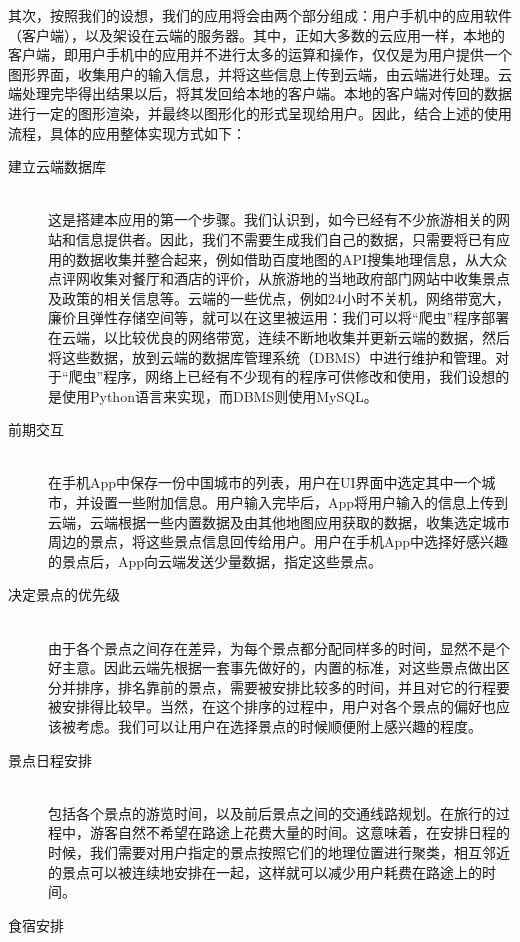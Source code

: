 \documentclass[12pt,a4paper]{article}
\begin{document}
\begin{CJK}{UTF8}{gbsn}
	其次，按照我们的设想，我们的应用将会由两个部分组成：用户手机中的应用软件（客户端），以及架设在云端的服务器。其中，正如大多数的云应用一样，本地的客户端，即用户手机中的应用并不进行太多的运算和操作，仅仅是为用户提供一个图形界面，收集用户的输入信息，并将这些信息上传到云端，由云端进行处理。云端处理完毕得出结果以后，将其发回给本地的客户端。本地的客户端对传回的数据进行一定的图形渲染，并最终以图形化的形式呈现给用户。因此，结合上述的使用流程，具体的应用整体实现方式如下：
	\begin{description}
	\item[建立云端数据库] \hfill \\
	这是搭建本应用的第一个步骤。我们认识到，如今已经有不少旅游相关的网站和信息提供者。因此，我们不需要生成我们自己的数据，只需要将已有应用的数据收集并整合起来，例如借助百度地图的API搜集地理信息，从大众点评网收集对餐厅和酒店的评价，从旅游地的当地政府部门网站中收集景点及政策的相关信息等。云端的一些优点，例如24小时不关机，网络带宽大，廉价且弹性存储空间等，就可以在这里被运用：我们可以将“爬虫”程序部署在云端，以比较优良的网络带宽，连续不断地收集并更新云端的数据，然后将这些数据，放到云端的数据库管理系统（DBMS）中进行维护和管理。对于“爬虫”程序，网络上已经有不少现有的程序可供修改和使用，我们设想的是使用Python语言来实现，而DBMS则使用MySQL。
	\item[前期交互] \hfill \\
	在手机App中保存一份中国城市的列表，用户在UI界面中选定其中一个城市，并设置一些附加信息。用户输入完毕后，App将用户输入的信息上传到云端，云端根据一些内置数据及由其他地图应用获取的数据，收集选定城市周边的景点，将这些景点信息回传给用户。用户在手机App中选择好感兴趣的景点后，App向云端发送少量数据，指定这些景点。
	\item[决定景点的优先级] \hfill \\
	由于各个景点之间存在差异，为每个景点都分配同样多的时间，显然不是个好主意。因此云端先根据一套事先做好的，内置的标准，对这些景点做出区分并排序，排名靠前的景点，需要被安排比较多的时间，并且对它的行程要被安排得比较早。当然，在这个排序的过程中，用户对各个景点的偏好也应该被考虑。我们可以让用户在选择景点的时候顺便附上感兴趣的程度。
	\item[景点日程安排] \hfill \\
	包括各个景点的游览时间，以及前后景点之间的交通线路规划。在旅行的过程中，游客自然不希望在路途上花费大量的时间。这意味着，在安排日程的时候，我们需要对用户指定的景点按照它们的地理位置进行聚类，相互邻近的景点可以被连续地安排在一起，这样就可以减少用户耗费在路途上的时间。
	\item[食宿安排] \hfill \\

\end{description}
\end{CJK}
\end{document}
